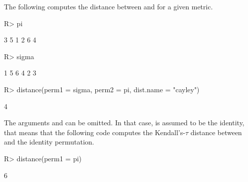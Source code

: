 \documentclass[article,nojss]{jss}
\begin{document}
The following computes the distance between  and  for a given metric. 
\begin{Schunk}
\begin{Sinput}
R> pi
\end{Sinput}
\begin{Soutput}
[1] 3 5 1 2 6 4
\end{Soutput}
\begin{Sinput}
R> sigma
\end{Sinput}
\begin{Soutput}
[1] 1 5 6 4 2 3
\end{Soutput}
\begin{Sinput}
R> distance(perm1 = sigma, perm2 = pi, dist.name = "cayley")
\end{Sinput}
\begin{Soutput}
[1] 4
\end{Soutput}
\end{Schunk}

The arguments  and  can be omitted. In that case,  is assumed to be the identity, that means that the following code computes the Kendall's-$\tau$ distance between  and the identity permutation.
\begin{Schunk}
\begin{Sinput}
R> distance(perm1 = pi)
\end{Sinput}
\begin{Soutput}
[1] 6
\end{Soutput}
\end{Schunk}
\end{document}
